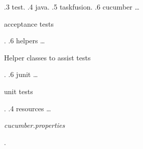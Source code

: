 \begin{figure}[H]
{        .3 test.
        .4 java.
        .5 taskfusion.
        .6 cucumber \ldots{} \begin{minipage}[t]{5cm} acceptance tests \end{minipage}.
        .6 helpers \ldots{} \begin{minipage}[t]{5cm} Helper classes to assist tests \end{minipage}.
        .6 junit \ldots{} \begin{minipage}[t]{5cm} unit tests \end{minipage}.
        .4 resources \ldots{} \begin{minipage}[t]{5cm} \emph{cucumber.properties} \end{minipage}.
    }
\end{figure}